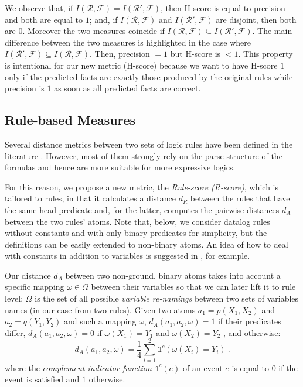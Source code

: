 \documentclass[letterpaper]{article} \usepackage{aaai20}  \usepackage{times}  \usepackage{helvet} \usepackage{courier}  \usepackage[hyphens]{url}  \usepackage{graphicx} \urlstyle{rm} \def\UrlFont{\rm}  \usepackage{graphicx}  \frenchspacing  \setlength{\pdfpagewidth}{8.5in}  \setlength{\pdfpageheight}{11in}  \usepackage{amsthm}
\theoremstyle{definition}
\begin{document}
We observe that, if $I(\mathcal{R},\mathcal{F}) = I(\mathcal{R}',\mathcal{F})$, then H-score is equal to precision and both are equal to $1$; and, if $I(\mathcal{R},\mathcal{F})$ and $I(\mathcal{R}',\mathcal{F})$ are disjoint, then both are $0$. Moreover the two measures coincide if $I(\mathcal{R},\mathcal{F}) \subseteq I(\mathcal{R}',\mathcal{F})$. 
The main difference between the two measures is highlighted in the case where $I(\mathcal{R}',\mathcal{F}) \subseteq I(\mathcal{R},\mathcal{F})$. 
Then, precision $=1$ but H-score is $<1$. This property is intentional for our new metric (H-score) because we want to have H-score $1$ only if the predicted facts are exactly those
produced by the original rules while precision is $1$ as soon as all predicted facts are correct.


\subsection{Rule-based Measures}
Several distance metrics between two sets of logic rules have been defined in the literature \cite{dist_1,dist_2,dist_3,dist_4,dist_5}. 
However, most of them strongly rely on the parse structure of the formulas and hence are more suitable for more expressive logics. 

For this reason, we propose a new metric, the \emph{Rule-score (R-score)}, which is tailored to rules, in that it calculates a distance $d_R$ between the rules that have the same head predicate and, for the latter, computes the pairwise distances $d_A$ between the two rules' atoms. Note that, below, we consider datalog rules without constants and with only binary predicates for simplicity, but the definitions can be easily extended to non-binary atoms. 
An idea of how to deal with constants in addition to variables is suggested in \cite{dist_2}, for example.



Our distance $d_A$ between two non-ground, binary atoms takes into account a specific mapping $\omega \in \Omega$ between their variables so that we can later lift it to rule level;
$\Omega$ is the set of all possible \emph{variable re-namings} between two sets of variables names (in our case from two rules). 
Given two atoms $a_1=p(X_1,X_2)$ and $a_2=q(Y_1,Y_2)$ and such a mapping $\omega$,  $d_A(a_1,a_2,\omega)=1$ if their predicates differ, $d_A(a_1,a_2,\omega)=0 $ if 
$\omega(X_1)=Y_1$ and $\omega(X_2)=Y_2$
, and otherwise:
$$
 d_A(a_1,a_2,\omega) = 
 \frac{1}{4} \sum\limits_{i =1}^2 \mathds{1}^c(\omega(X_i)=Y_i)
~.$$
where the \emph{complement indicator function} $\mathds{1}^c(e)$ of an event $e$ is equal to $0$ if the event is satisfied and $1$ otherwise.
\end{document}
